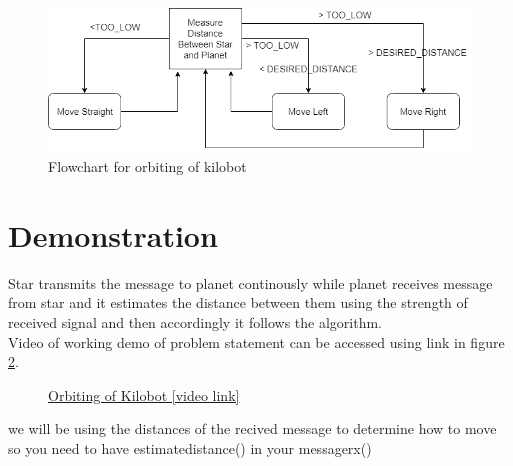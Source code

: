 \begin{figure}
    \centering
    \includegraphics[scale=0.6]{images/orbiting}
    \caption{Flowchart for orbiting of kilobot}
    \label{fig:orbit_flowchart}
\end{figure}
\section{Demonstration}
Star transmits the message to planet continously while planet receives message from star and it estimates the distance between them using the strength of received signal and then accordingly it follows the algorithm.\\
Video of working demo of problem statement can be accessed using link in figure \ref{fig:orbit}.
\begin{figure}[H]
	\centering
	\caption{\href{https://photos.app.goo.gl/xPYoywncwhCk585X8}{Orbiting of Kilobot [video link]}}
	\label{fig:orbit}
\end{figure}
we will be using the distances of the recived message to determine how to move so you need to have estimate\textunderscore distance() in your message\textunderscore rx()\\

